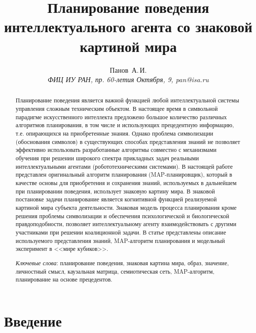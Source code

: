 \documentclass[12pt]{scrartcl}
\title{Планирование поведения интеллектуального агента со знаковой картиной мира}
\author{Панов~А.\,И.\\
{\large\slshape ФИЦ ИУ РАН, пр. 60-летия Октября, 9, pan@isa.ru}}
\date{}
\begin{document}
	
	\maketitle{}
	\begin{abstract}
		Планирование поведения является важной функцией любой интеллектуальной системы управления сложным техническим объектом. В настоящее время в символьной парадигме искусственного интеллекта предложено большое количество различных алгоритмов планирования, в том числе и использующих прецедентную информацию, т.е. опирающихся на приобретенные знания. Однако проблема символизации (обоснования символов) в существующих способах представления знаний не позволяет эффективно использовать разработанные алгоритмы совместно с механизмами обучения при решении широкого спектра прикладных задач реальными интеллектуальными агентами (робототехническими системами). В настоящей работе представлен оригинальный алгоритм планирования (MAP-планировщик), который в качестве основы для приобретения и сохранения знаний, используемых в дальнейшем при планировании поведения, использует знаковую картину мира. В знаковой постановке задачи планирование является когнитивной функцией реализуемой картиной мира субъекта деятельности. Знаковая модель процесса планирования кроме решения проблемы символизации и обеспечения психологической и биологической правдоподобности, позволяет интеллектуальному агенту взаимодействовать с другими участниками при решении коалиционной задачи. В статье представлены описание используемого представления знаний, MAP-алгоритм планирования и модельный эксперимент в <<мире кубиков>>.
		\par\bigskip
		\textit{Ключевые слова}: планирование поведения, знаковая картина мира, образ, значение, личностный смысл, каузальная матрица, семиотическая сеть, MAP-алгоритм, планирование на основе прецедентов.
	\end{abstract}
	
	
	
	\section*{Введение}
	
\end{document}
